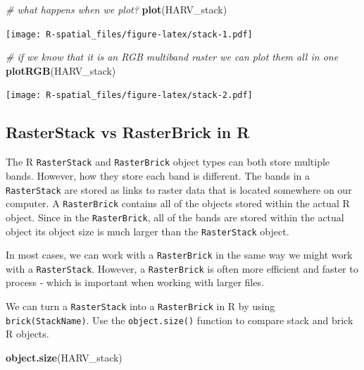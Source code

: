 \documentclass[]{book}
\newenvironment{Shaded}{\begin{snugshade}}{\end{snugshade}}
\newcommand{\KeywordTok}[1]{\textcolor[rgb]{0.13,0.29,0.53}{\textbf{#1}}}
\newcommand{\CommentTok}[1]{\textcolor[rgb]{0.56,0.35,0.01}{\textit{#1}}}
\newcommand{\NormalTok}[1]{#1}
\theoremstyle{definition}
\theoremstyle{definition}
\theoremstyle{definition}
\theoremstyle{remark}
\begin{document}
\begin{Shaded}
\begin{Highlighting}[]
\CommentTok{# what happens when we plot?}
\KeywordTok{plot}\NormalTok{(HARV_stack)}
\end{Highlighting}
\end{Shaded}

\texttt{[image: R-spatial\_files/figure-latex/stack-1.pdf]}

\begin{Shaded}
\begin{Highlighting}[]
\CommentTok{# if we know that it is an RGB multiband raster we can plot them all in one}
\KeywordTok{plotRGB}\NormalTok{(HARV_stack)}
\end{Highlighting}
\end{Shaded}

\texttt{[image: R-spatial\_files/figure-latex/stack-2.pdf]}

\subsection{RasterStack vs RasterBrick in
R}\label{rasterstack-vs-rasterbrick-in-r}

The R \texttt{RasterStack} and \texttt{RasterBrick} object types can
both store multiple bands. However, how they store each band is
different. The bands in a \texttt{RasterStack} are stored as links to
raster data that is located somewhere on our computer. A
\texttt{RasterBrick} contains all of the objects stored within the
actual R object. Since in the \texttt{RasterBrick}, all of the bands are
stored within the actual object its object size is much larger than the
\texttt{RasterStack} object.

In most cases, we can work with a \texttt{RasterBrick} in the same way
we might work with a \texttt{RasterStack}. However, a
\texttt{RasterBrick} is often more efficient and faster to process -
which is important when working with larger files.

We can turn a \texttt{RasterStack} into a \texttt{RasterBrick} in R by
using \texttt{brick(StackName)}. Use the \texttt{object.size()} function
to compare stack and brick R objects.

\begin{Shaded}
\begin{Highlighting}[]
\KeywordTok{object.size}\NormalTok{(HARV_stack)}
\end{Highlighting}
\end{Shaded}
\end{document}
